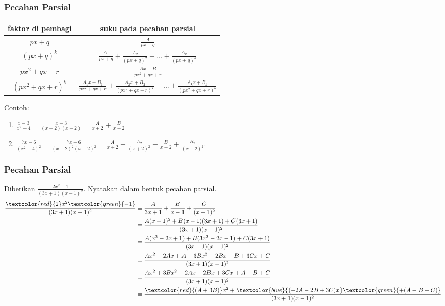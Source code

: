 \documentclass[11pt]{beamer}
\begin{document}
	\begin{frame}
		\frametitle{Pecahan Parsial}
		
	\begin{tabular}{|c|c|}
		\hline faktor di pembagi
		&  suku pada pecahan parsial\\
		\hline $px+q$
		&  $\frac{A}{px+q}$\\
		\hline $(px+q)^k$ 
		& $\frac{A_{1}}{px+q}+\frac{A_{2}}{(px+q)^2}+...+\frac{A_{k}}{(px+q)^k}$ \\
		\hline $px^2+qx+r$
		& $\frac{Ax+B}{px^2+qx+r}$ \\
		\hline $(px^2+qx+r)^k$
		& $\frac{A_{1}x+B_1}{px^2+qx+r}+\frac{A_{2}x+B_2}{(px^2+qx+r)^2}+...+\frac{A_{k}x+B_k}{(px^2+qx+r)^k}$ \\
		\hline
	\end{tabular}
	Contoh:
		\begin{enumerate}
			\item $\frac{x-3}{x^2-4}=\frac{x-3}{(x+2)(x-2)}=\frac{A}{x+2}+\frac{B}{x-2}$
			\item $\frac{7x-6}{(x^2-4)^2}=\frac{7x-6}{(x+2)^2(x-2)^2}=\frac{A}{x+2}+\frac{A_2}{(x+2)^2}+\frac{B}{x-2}+\frac{B_2}{(x-2)^2}$.
		\end{enumerate}	
	\end{frame}
	
	\begin{frame}
		\frametitle{Pecahan Parsial}
		Diberikan $\frac{2x^2-1}{(3x+1)(x-1)^2}$. Nyatakan dalam bentuk pecahan parsial.\\
		\begin{align*}
			\frac{\textcolor{red}{2}x^2\textcolor{green}{-1}}{(3x+1)(x-1)^2}&\equiv \frac{A}{3x+1}+\frac{B}{x-1}+\frac{C}{(x-1)^2}\\
			&\equiv\frac{A(x-1)^2+B(x-1)(3x+1)+C(3x+1)}{(3x+1)(x-1)^2}\\
			&\equiv \frac{A(x^2-2x+1)+B(3x^2-2x-1)+C(3x+1)}{(3x+1)(x-1)^2}\\
			&\equiv \frac{Ax^2-2Ax+A+3Bx^2-2Bx-B+3Cx+C}{(3x+1)(x-1)^2}\\
			&\equiv \frac{Ax^2+3Bx^2-2Ax-2Bx+3Cx+A-B+C}{(3x+1)(x-1)^2}\\
			&\equiv \frac{\textcolor{red}{(A+3B)}x^2+\textcolor{blue}{(-2A-2B+3C)x}\textcolor{green}{+(A-B+C)}}{(3x+1)(x-1)^2}
		\end{align*}
		
	\end{frame}
	
\end{document}
